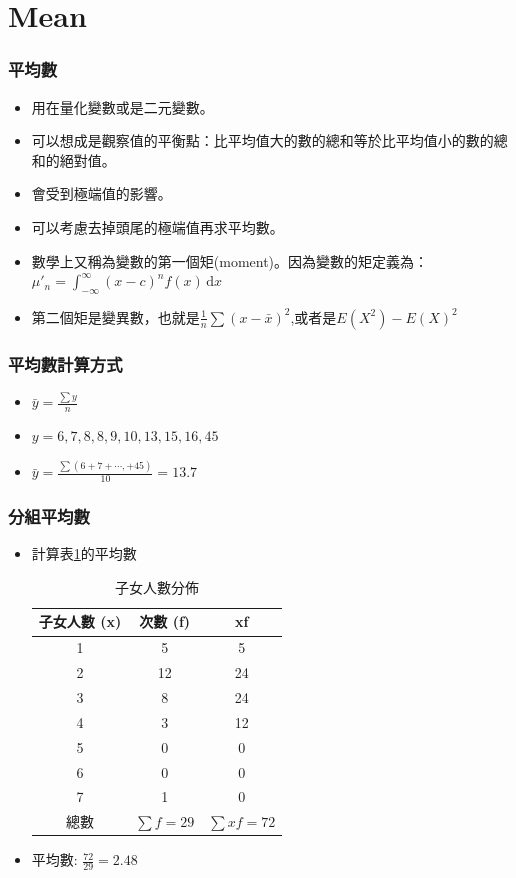 \documentclass{beamer}
\begin{document}
\section{Mean}
\begin{frame}\frametitle{平均數}
\begin{itemize}
\item 用在量化變數或是二元變數。
\item 可以想成是觀察值的平衡點：比平均值大的數的總和等於比平均值小的數的總和的絕對值。
\item 會受到極端值的影響。
\item 可以考慮去掉頭尾的極端值再求平均數。
\item 數學上又稱為變數的第一個矩(moment)。因為變數的矩定義為：
$\mu' _{n}=\int_{-\infty}^{\infty} (x-c)^n f(x) \, \mathrm{d}x$
\item 第二個矩是變異數，也就是$\frac{1}{n}\sum (x-\bar{x})^2$,或者是$E(X^2)-E(X)^2$
\end{itemize}
\end{frame}
\begin{frame}\frametitle{平均數計算方式}
\begin{itemize}
\item $\bar{y}=\frac{\sum y}{n}$
\item $y=6, 7, 8, 8, 9, 10, 13, 15, 16, 45$
\item $\bar{y}=\frac{\sum (6+7+\cdots , +45)}{10}=13.7$
\end{itemize}
\end{frame}
\begin{frame}\frametitle{分組平均數}
\begin{itemize}
\item 計算表\ref{tab:kids}的平均數
\begin{table}
\caption{子女人數分佈}
\label{tab:kids}
\begin{tabular}{| c |  c | c |}
\hline
子女人數 (x) & 次數 (f) & xf\\
\hline
1 & 5 & 5\\
2 & 12 & 24\\
3 & 8 & 24\\
4 & 3  & 12\\
5 & 0  & 0\\
6 & 0	& 0\\
7 & 1	& 0\\
\hline
總數 & $\sum f=29$ & $\sum xf=72$\\
\hline
\end{tabular}
\end{table}
\item 平均數: $\frac{72}{29}=2.48$
\end{itemize}
\end{frame}
\end{document}
